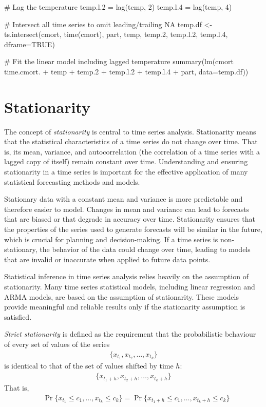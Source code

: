 \begin{samepage}
\begin{Rcode}
# Lag the temperature
temp.l.2 = lag(temp, 2)
temp.l.4 = lag(temp, 4)

# Intersect all time series to omit leading/trailing NA
temp.df <- ts.intersect(cmort, time(cmort), part, 
                        temp, temp.2, temp.l.2, temp.l.4, 
                        dframe=TRUE)
                        
# Fit the linear model including lagged temperature
summary(lm(cmort ~ time.cmort. + temp + temp.2 + 
                   temp.l.2 + temp.l.4 + part, data=temp.df))
\end{Rcode}
\end{samepage}

\section{Stationarity}

The concept of \emph{stationarity} is central to time series analysis. Stationarity means that the statistical characteristics of a time series do not change over time. That is, its mean, variance, and autocorrelation (the correlation of a time series with a lagged copy of itself) remain constant over time. Understanding and ensuring stationarity in a time series is important for the effective application of many statistical forecasting methods and models.

Stationary data with a constant mean and variance is more predictable and therefore easier to model. Changes in mean and variance can lead to forecasts that are biased or that degrade in accuracy over time. Stationarity ensures that the properties of the series used to generate forecasts will be similar in the future, which is crucial for planning and decision-making. If a time series is non-stationary, the behavior of the data could change over time, leading to models that are invalid or inaccurate when applied to future data points.

Statistical inference in time series analysis relies heavily on the assumption of stationarity. Many time series statistical models, including linear regression and ARMA models, are based on the assumption of stationarity. These models provide meaningful and reliable results only if the stationarity assumption is satisfied. 

\emph{Strict stationarity} is defined as the requirement that the probabilistic behaviour of every set of values of the series
\begin{align*}\{x_{t_1}, x_{t_2}, \ldots, x_{t_k} \} \end{align*}
\noindent is identical to that of the set of values shifted by time $h$:
\begin{align*}
\{x_{t_1+h}, x_{t_2+h}, \ldots, x_{t_k + h} \}
\end{align*}
\noindent That is,
\begin{align*}
&\Pr \{ x_{t_1} \leq c_1, \ldots, x_{t_k} \leq c_k \} = \Pr \{ x_{t_1+h}\leq c_1, \ldots , x_{t_k+h} \leq c_k \}
\end{align*}

